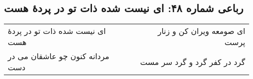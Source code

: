 \begin{center}
\section*{رباعی شماره ۴۸: ای نیست شده ذات تو در پردهٔ هست}
\label{sec:sh048}
\begin{longtable}{l p{0.5cm} r}
ای نیست شده ذات تو در پردهٔ هست
&&
ای صومعه ویران کن و زنار پرست
\\
مردانه کنون چو عاشقان می در دست
&&
گرد در کفر گرد و گرد سر مست
\\
\end{longtable}
\end{center}
